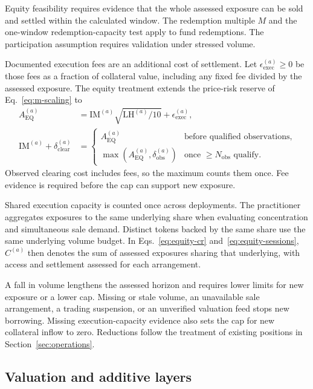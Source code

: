 Equity feasibility requires evidence that the whole assessed exposure can be sold
and settled within the calculated window. The redemption multiple $M$ and the
one-window redemption-capacity test apply to fund redemptions.
The participation assumption requires validation under stressed volume.

Documented execution fees are an additional cost of settlement. Let
$\epsilon_{\mathrm{exec}}^{(a)}\ge0$ be those fees as a fraction of collateral value,
including any fixed fee divided by the assessed exposure. The equity treatment
extends the price-risk reserve of Eq.~\eqref{eq:m-scaling} to
\begin{equation}\label{eq:equity-clearing}
\begin{aligned}
A^{(a)}_{\mathrm{EQ}}&=\mathrm{IM}^{(a)}\sqrt{\mathrm{LH}^{(a)}/10}
+\epsilon_{\mathrm{exec}}^{(a)},\\
\mathrm{IM}^{(a)}+\delta_{\mathrm{clear}}^{(a)}&=
\begin{cases}
A^{(a)}_{\mathrm{EQ}} & \text{before qualified observations,}\\
\max\!\left(A^{(a)}_{\mathrm{EQ}},\delta_{\mathrm{obs}}^{(a)}\right)
& \text{once }\ge N_{\mathrm{obs}}\text{ qualify.}
\end{cases}
\end{aligned}
\end{equation}
Observed clearing cost includes fees, so the maximum counts them once.
Fee evidence is required before the cap can support new exposure.

Shared execution capacity is counted once across deployments. The practitioner
aggregates exposures to the same underlying share when evaluating concentration
and simultaneous sale demand. Distinct tokens backed by the same share use the
same underlying volume budget. In Eqs.~\eqref{eq:equity-cr} and~\eqref{eq:equity-sessions}, $C^{(a)}$ then denotes the sum of assessed exposures sharing that underlying, with access and settlement assessed for each arrangement.

A fall in volume lengthens the assessed horizon
and requires lower limits for new exposure or a lower cap. Missing or stale volume,
an unavailable sale arrangement, a trading suspension, or an unverified valuation
feed stops new borrowing. Missing execution-capacity evidence also sets the cap
for new collateral inflow to zero. Reductions follow the treatment of existing
positions in Section~\ref{sec:operations}.

\subsection{Valuation and additive layers}\label{sec:equity-layers}

